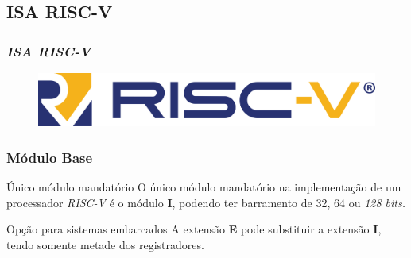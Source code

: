 \documentclass[aspectratio=169]{beamer}
\begin{document}
    \subsection{ISA RISC-V}
    \begin{frame}
        \vfill
        \frametitle{\textit{\textbf{ISA RISC-V}}}
        \begin{figure}[H]
        \centering
            \includegraphics[width=.8\textwidth,height=.8\textheight,keepaspectratio]
            {../images/riscv_logo.png}
        \end{figure}
        \vfill
    \end{frame}

    \begin{frame}
        \frametitle{Módulo Base}
        \vfill
        \begin{block}{Único módulo mandatório}
            { O único módulo mandatório na implementação de um processador \textit{RISC-V}
                é o módulo \textbf{I}, podendo ter barramento de 32, 64 ou \textit{128 bits.}
            }
        \end{block}
        \vfill
        \begin{exampleblock}{Opção para sistemas embarcados}
            { A extensão \textbf{E} pode substituir a extensão \textbf{I}, tendo somente metade
                dos registradores.
            }
        \end{exampleblock}
        \vfill
    \end{frame}
\end{document}
